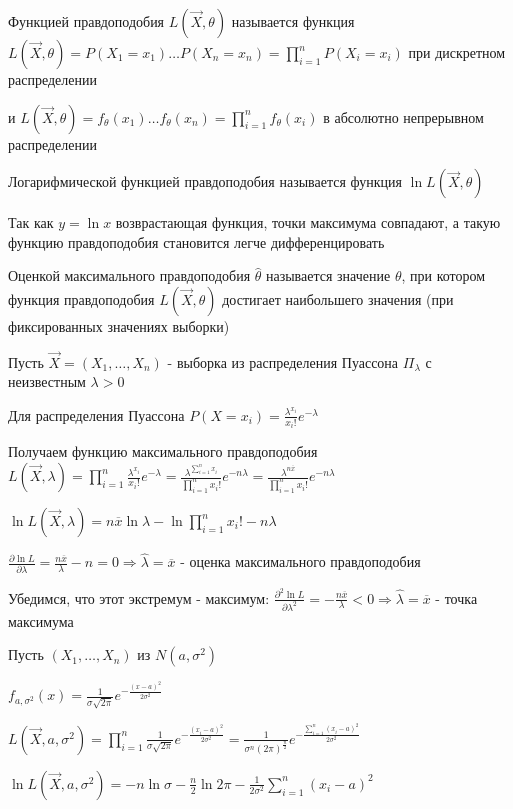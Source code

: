 \documentclass[12pt]{article}
\begin{document}
\Def Функцией правдоподобия $L(\vec{X}, \theta)$ называется функция $L(\vec{X}, \theta) = P(X_1 = x_1) \dots P(X_n = x_n) = \prod_{i = 1}^n P(X_i = x_i)$ при дискретном распределении

и $L(\vec{X}, \theta) = f_\theta(x_1) \dots f_\theta(x_n) = \prod_{i = 1}^n f_\theta(x_i)$ в абсолютно непрерывном распределении

\Def Логарифмической функцией правдоподобия называется функция $\ln L(\vec{X}, \theta)$

\Nota Так как $y = \ln x$ возврастающая функция, точки максимума совпадают, а такую функцию правдоподобия становится легче дифференцировать

\Def Оценкой максимального правдоподобия $\hat{\theta}$ называется значение $\theta$, при котором функция правдоподобия 
$L(\vec{X}, \theta)$ достигает наибольшего значения (при фиксированных значениях выборки)

 Пусть $\vec{X} = (X_1, \dots, X_n)$ - выборка из распределения Пуассона $\Pi_\lambda$ с неизвестным $\lambda > 0$

\Mem Для распределения Пуассона $P(X = x_i) = \frac{\lambda^{x_i}}{x_i!} e^{-\lambda}$

Получаем функцию максимального правдоподобия $L(\vec{X}, \lambda) = \prod_{i = 1}^n \frac{\lambda^{x_i}}{x_i!} e^{-\lambda} = 
\frac{\lambda^{\sum_{i = 1}^n x_i}}{\prod_{i = 1}^n x_i!} e^{-n\lambda} = \frac{\lambda^{n \overline{x}}}{\prod_{i = 1}^n x_i!} e^{-n\lambda}$

$\ln L(\vec{X}, \lambda) = n \overline{x} \ln \lambda - \ln \prod_{i = 1}^n x_i! - n\lambda$

$\frac{\partial \ln L}{\partial \lambda} = \frac{n \overline{x}}{\lambda} - n = 0 \Longrightarrow \hat{\lambda} = \overline{x}$ - оценка максимального правдоподобия

Убедимся, что этот экстремум - максимум: $\frac{\partial^2 \ln L}{\partial \lambda^2} = -\frac{n \overline{x}}{\lambda} < 0 \Longrightarrow \hat{\lambda} = \overline{x}$ - точка максимума

 Пусть $(X_1, \dots, X_n)$ из $N(a, \sigma^2)$

$f_{a, \sigma^2} (x) = \frac{1}{\sigma \sqrt{2\pi}} e^{-\frac{(x - a)^2}{2\sigma^2}}$

$L(\vec{X}, a, \sigma^2) = \prod_{i = 1}^n \frac{1}{\sigma \sqrt{2\pi}} e^{-\frac{(x_i - a)^2}{2\sigma^2}} = 
\frac{1}{\sigma^n (2\pi)^{\frac{n}{2}}} e^{-\frac{\sum_{i = 1}^n (x_i - a)^2}{2\sigma^2}}$

$\ln L(\vec{X}, a, \sigma^2) = -n\ln \sigma - \frac{n}{2} \ln 2\pi - \frac{1}{2\sigma^2}\sum_{i = 1}^n (x_i - a)^2$
\end{document}
